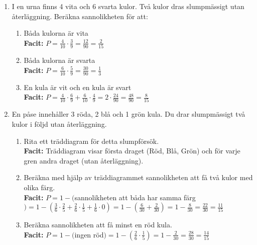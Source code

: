 \documentclass[a4paper,11pt]{article}
\begin{document}
\begin{enumerate}[label=\textbf{\arabic*.}]
    \item I en urna finns 4 vita och 6 svarta kulor. Två kulor dras slumpmässigt utan återläggning. Beräkna sannolikheten för att:
    \begin{enumerate}[label=\alph*)]
        \item Båda kulorna är vita
        \\ \textbf{Facit:} $P=\frac{4}{10}\cdot\frac{3}{9}=\frac{12}{90}=\frac{2}{15}$
        \item Båda kulorna är svarta
        \\ \textbf{Facit:} $P=\frac{6}{10}\cdot\frac{5}{9}=\frac{30}{90}=\frac{1}{3}$
        \item En kula är vit och en kula är svart
        \\ \textbf{Facit:} $P=\frac{4}{10}\cdot\frac{6}{9}+\frac{6}{10}\cdot\frac{4}{9}=2\cdot\frac{24}{90}=\frac{48}{90}=\frac{8}{15}$
    \end{enumerate}
    
    \item En påse innehåller 3 röda, 2 blå och 1 grön kula. Du drar slumpmässigt två kulor i följd utan återläggning.
    \begin{enumerate}[label=\alph*)]
        \item Rita ett träddiagram för detta slumpförsök.
        \\ \textbf{Facit:} Träddiagram visar första draget (Röd, Blå, Grön) och för varje gren andra draget (utan återläggning).
        \item Beräkna med hjälp av träddiagrammet sannolikheten att få två kulor med olika färg.
        \\ \textbf{Facit:} $P=1-($sannolikheten att båda har samma färg$) = 1-(\frac{3}{6}\cdot\frac{2}{5}+\frac{2}{6}\cdot\frac{1}{5}+\frac{1}{6}\cdot0)=1-(\frac{6}{30}+\frac{2}{30})=1-\frac{8}{30}=\frac{22}{30}=\frac{11}{15}$
        \item Beräkna sannolikheten att få minst en röd kula.
        \\ \textbf{Facit:} $P=1-($ingen röd$)=1-(\frac{2}{6}\cdot\frac{1}{5})=1-\frac{2}{30}=\frac{28}{30}=\frac{14}{15}$
    \end{enumerate}
    

\end{enumerate}
\end{document}
